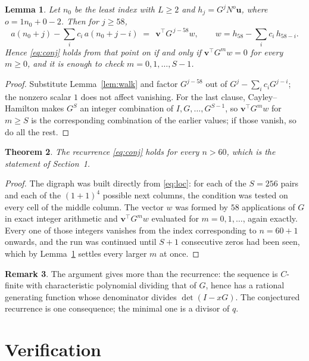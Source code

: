 \documentclass[11pt,a4paper]{article}
\theoremstyle{plain}
\newtheorem{theorem}{Theorem}
\newtheorem{lemma}[theorem]{Lemma}
\theoremstyle{definition}
\newtheorem{remark}[theorem]{Remark}
\begin{document}
\begin{lemma}\label{lem:crit}
Let $n_0$ be the least index with $L\ge2$ and $h_j=G^{j}N^{o}\mathbf{u}$, where
$o=1n_0+0-2$. Then for $j\ge58$,
\[
a(n_0+j)-\sum_i c_i\,a(n_0+j-i)\;=\;\,\mathbf{v}^{\!\top}G^{\,j-58}w,
\qquad w=h_{58}-\sum_i c_i\,h_{58-i} .
\]
Hence \eqref{eq:conj} holds from that point on if and only if
$\mathbf{v}^{\!\top}G^{m}w=0$ for every $m\ge0$, and it is enough to check
$m=0,1,\dots,S-1$.
\end{lemma}

\begin{proof}
Substitute Lemma~\ref{lem:walk} and factor $G^{j-58}$ out of
$G^{j}-\sum_ic_iG^{j-i}$; the nonzero scalar $1$ does not affect
vanishing. For the last clause, Cayley--Hamilton makes $G^{S}$ an integer combination of
$I,G,\dots,G^{S-1}$, so $\mathbf{v}^{\!\top}G^{m}w$ for $m\ge S$ is the corresponding
combination of the earlier values; if those vanish, so do all the rest.
\end{proof}

\begin{theorem}
The recurrence \eqref{eq:conj} holds for every $n>60$, which is the statement of
Section~1.
\end{theorem}

\begin{proof}
The digraph was built directly from \eqref{eq:loc}: for each of the $S=256$ pairs and each
of the $(1+1)^{4}$ possible next columns, the condition was tested on every cell of
the middle column. The vector $w$ was formed by $58$ applications of $G$ in exact integer
arithmetic and $\mathbf{v}^{\!\top}G^{m}w$ evaluated for $m=0,1,\dots$, again exactly.
Every one of those integers vanishes from the index corresponding to $n=60+1$ onwards,
and the run was continued until $S+1$ consecutive zeros had been seen, which by
Lemma~\ref{lem:crit} settles every larger $m$ at once.
\end{proof}

\begin{remark}
The argument gives more than the recurrence: the sequence is $C$-finite with characteristic
polynomial dividing that of $G$, hence has a rational generating function whose denominator
divides $\det(I-xG)$. The conjectured recurrence is one consequence; the minimal one is a
divisor of $q$.
\end{remark}

\section{Verification}
\end{document}
